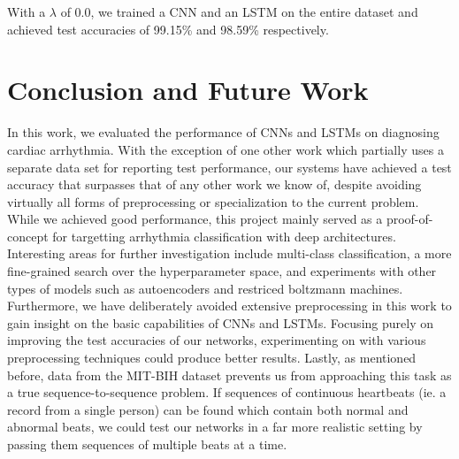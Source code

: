 \documentclass{article} %
\begin{document}
With a $\lambda$ of 0.0, we trained a CNN and an LSTM on the entire dataset and achieved test accuracies of 99.15\% and 98.59\% respectively.

\section{Conclusion and Future Work}

In this work, we evaluated the performance of CNNs and LSTMs on diagnosing cardiac arrhythmia. With the exception of one other work which partially uses a separate data set for reporting test performance, our systems have achieved a test accuracy that surpasses that of any other work we know of, despite avoiding virtually all forms of preprocessing or specialization to the current problem. While we achieved good performance, this project mainly served as a proof-of-concept for targetting arrhythmia classification with deep architectures. Interesting areas for further investigation include multi-class classification, a more fine-grained search over the hyperparameter space, and experiments with other types of models such as autoencoders and restriced boltzmann machines. Furthermore, we have deliberately avoided extensive preprocessing in this work to gain insight on the basic capabilities of CNNs and LSTMs. Focusing purely on improving the test accuracies of our networks, experimenting on with various preprocessing techniques could produce better results. Lastly, as mentioned before, data from the MIT-BIH dataset prevents us from approaching this task as a true sequence-to-sequence problem. If sequences of continuous heartbeats (ie. a record from a single person) can be found which contain both normal and abnormal beats, we could test our networks in a far more realistic setting by passing them sequences of multiple beats at a time.
\end{document}
